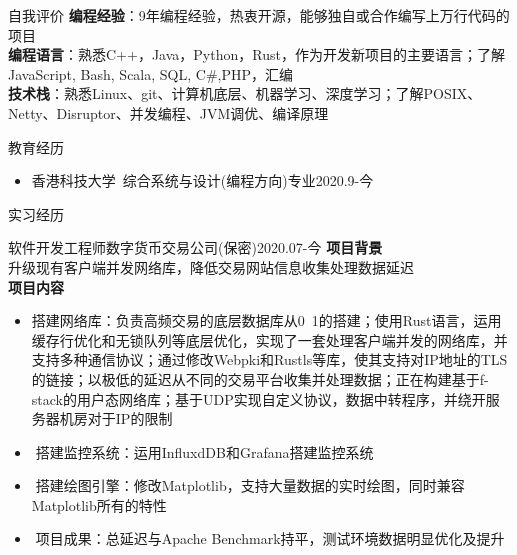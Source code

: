 \documentclass[UTF8]{resume}
\begin{document}
\begin{rSection}{自我评价}
    \textbf{编程经验}：9年编程经验，热衷开源，能够独自或合作编写上万行代码的项目\\
    \textbf{编程语言}：熟悉C++，Java，Python，Rust，作为开发新项目的主要语言；了解JavaScript, Bash, Scala, SQL, C\#,PHP，汇编\\
    \textbf{技术栈}：熟悉Linux、git、计算机底层、机器学习、深度学习；了解POSIX、Netty、Disruptor、并发编程、JVM调优、编译原理\\
\end{rSection}

\begin{rSection}{教育经历}
    \begin{itemize}
        \item 香港科技大学~综合系统与设计(编程方向)专业\hfill 2020.9-今
    \end{itemize}
\end{rSection}

\begin{rSection}{实习经历}
    \begin{rExperience}{软件开发工程师}{数字货币交易公司(保密)}{2020.07-今}
        \textbf{项目背景}\\
        升级现有客户端并发网络库，降低交易网站信息收集处理数据延迟\\
        \textbf{项目内容}
        \begin{itemize}
            \itemsep -0.5em \vspace{-0.5em}
            \item 搭建网络库：负责高频交易的底层数据库从0~1的搭建；使用Rust语言，运用缓存行优化和无锁队列等底层优化，实现了一套处理客户端并发的网络库，并支持多种通信协议；通过修改Webpki和Rustls等库，使其支持对IP地址的TLS的链接；以极低的延迟从不同的交易平台收集并处理数据；正在构建基于f-stack的用户态网络库；基于UDP实现自定义协议，数据中转程序，并绕开服务器机房对于IP的限制
            \item搭建监控系统：运用InfluxdDB和Grafana搭建监控系统 %
            \item搭建绘图引擎：修改Matplotlib，支持大量数据的实时绘图，同时兼容Matplotlib所有的特性
            \item项目成果：总延迟与Apache Benchmark持平，测试环境数据明显优化及提升
        \end{itemize}
    \end{rExperience}
\end{rSection}
\end{document}
